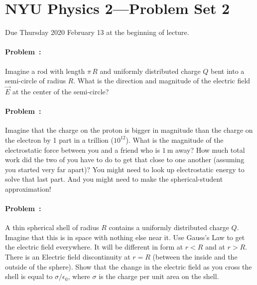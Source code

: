 \documentclass[12pt]{article}
\begin{document}
\section*{NYU Physics 2---Problem Set 2}

Due Thursday 2020 February 13 at the beginning of lecture.

\paragraph{Problem~\theproblem:}%
Imagine a rod with length $\pi\,R$ and uniformly distributed charge
$Q$ bent into a semi-circle of radius $R$.  What is the direction and
magnitude of the electric field $\vec{E}$ at the center of the
semi-circle?

\paragraph{Problem~\theproblem:}%
Imagine that the charge on the proton is bigger in magnitude than the
charge on the electron by 1 part in a trillion ($10^{12}$).  What is
the magnitude of the electrostatic force between you and a friend who
is $1~\mathrm{m}$ away?  How much total work did the two of you have
to do to get that close to one another (assuming you started very far
apart)? You might need to look up electrostatic energy to solve that last part.
And you might need to make the spherical-student approximation!

\paragraph{Problem~\theproblem:}%
A thin spherical shell of radius $R$ contains a uniformly distributed
charge $Q$.  Imagine that this is in space with nothing else near
it. Use Gauss's Law to get the electric field everywhere. It will be
different in form at $r<R$ and at $r>R$. There is an Electric field
discontinuity at $r=R$ (between the inside and the outside of the sphere). Show
that the change in the electric field as you cross the shell is equal
to $\sigma/\epsilon_0$, where $\sigma$ is the charge per unit area on
the shell.
\end{document}
